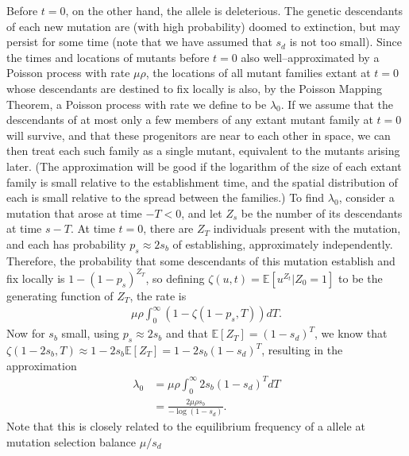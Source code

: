 \documentclass{article}
\newcommand{\E}{\mathbb{E}}
\begin{document}
Before $t=0$, on the other hand, the allele is deleterious.
The genetic descendants of each new mutation are (with high probability) doomed to extinction,
but may persist for some time (note that we have assumed that $s_d$ is not too small).
Since the times and locations of mutants before $t=0$ also
well--approximated by a 
Poisson process with rate $\mu \rho$,
the locations of all mutant families extant at $t=0$ whose descendants are destined to fix locally is also,
by the Poisson Mapping Theorem, a Poisson process with rate we define to be $\lambda_0$.
If we assume that the descendants of at most only a few members of any extant mutant family at $t=0$ will survive,
and that these progenitors are near to each other in space, we can then treat each such family as a single mutant,
equivalent to the mutants arising later.
(The approximation will be good if the logarithm of the size of each extant family is small relative to the establishment time,
and the spatial distribution of each is small relative to the spread between the families.)
To find $\lambda_0$, consider a mutation that arose at time $-T<0$, and let $Z_s$ be the number of its descendants at time $s-T$.
At time $t=0$, there are $Z_T$ individuals present with the mutation,
and each has probability $p_s \approx 2s_b$ of establishing, approximately independently.
Therefore, the probability that some descendants of this mutation establish and fix locally is $1-(1-p_s)^{Z_T}$,
so defining $\zeta(u,t) = \E[u^{Z_t} | Z_0=1 ]$ to be the generating function of $Z_T$,
the rate is
\begin{align*}
    \mu \rho \int_0^\infty \left( 1- \zeta(1-p_s,T) \right) dT .
\end{align*}
Now for $s_b$ small, using $p_s \approx 2s_b$ and that $\E[Z_T]=(1-s_d)^T$,
we know that $\zeta(1-2s_b,T) \approx 1-2s_b \E[Z_T] = 1-2s_b (1-s_d)^T$,
resulting in the approximation
\begin{align}
    \lambda_0 &= \mu \rho \int_0^\infty 2s_b (1-s_d)^{T} dT \\
        &= \frac{ 2 \mu \rho s_b }{ -\log(1-s_d) } .
\end{align}
Note that this is closely related to the equilibrium frequency of a
allele at mutation selection balance $\mu/s_d$ \citep{Haldane?}
\end{document}
